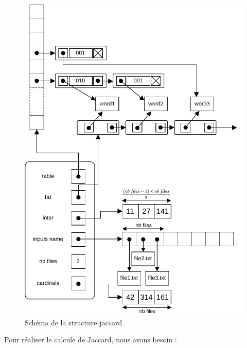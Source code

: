 \documentclass[a4paper, 12pt]{article}
\begin{document}
\begin{figure}[H]
\centering
\begin{tcolorbox}[enhanced,
colback=white,
colframe=codeblue,
fonttitle=\bfseries,
title=Schéma,
boxrule=2pt,
width=0.8\textwidth]
\includegraphics[width=\textwidth]{jaccard_schema.pdf}
\end{tcolorbox}
\caption{Schéma de la structure jaccard}
\label{fig:jaccard_shema}
\end{figure}

Pour réaliser le calcule de Jaccard, nous avons besoin : 
\end{document}
